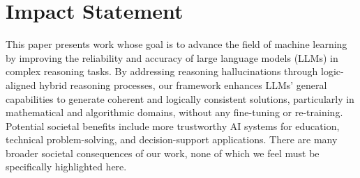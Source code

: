 
\section*{Impact Statement}
This paper presents work whose goal is to advance the field of machine learning by improving the reliability and accuracy of large language models (LLMs) in complex reasoning tasks. 
By addressing reasoning hallucinations through logic-aligned hybrid reasoning processes, our framework enhances LLMs' general capabilities to generate coherent and logically consistent solutions, particularly in mathematical and algorithmic domains, without any fine-tuning or re-training. 
Potential societal benefits include more trustworthy AI systems for education, technical problem-solving, and decision-support applications. There are many broader societal consequences of our work, none of which we feel must be specifically highlighted here.